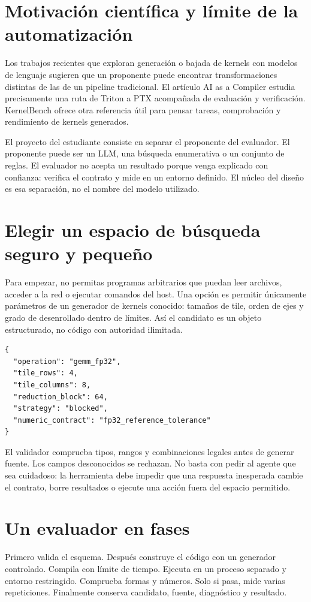 \documentclass[12pt,a4paper,oneside]{report}
\begin{document}
\section{Motivación científica y límite de la automatización}
Los trabajos recientes que exploran generación o bajada de kernels con modelos de lenguaje sugieren que un proponente puede encontrar transformaciones distintas de las de un pipeline tradicional. El artículo AI as a Compiler estudia precisamente una ruta de Triton a PTX acompañada de evaluación y verificación. KernelBench ofrece otra referencia útil para pensar tareas, comprobación y rendimiento de kernels generados. \cite{taic,kernelbench}

El proyecto del estudiante consiste en separar el proponente del evaluador. El proponente puede ser un LLM, una búsqueda enumerativa o un conjunto de reglas. El evaluador no acepta un resultado porque venga explicado con confianza: verifica el contrato y mide en un entorno definido. El núcleo del diseño es esa separación, no el nombre del modelo utilizado.

\section{Elegir un espacio de búsqueda seguro y pequeño}
Para empezar, no permitas programas arbitrarios que puedan leer archivos, acceder a la red o ejecutar comandos del host. Una opción es permitir únicamente parámetros de un generador de kernels conocido: tamaños de tile, orden de ejes y grado de desenrollado dentro de límites. Así el candidato es un objeto estructurado, no código con autoridad ilimitada.

\begin{lstlisting}
{
  "operation": "gemm_fp32",
  "tile_rows": 4,
  "tile_columns": 8,
  "reduction_block": 64,
  "strategy": "blocked",
  "numeric_contract": "fp32_reference_tolerance"
}
\end{lstlisting}
El validador comprueba tipos, rangos y combinaciones legales antes de generar fuente. Los campos desconocidos se rechazan. No basta con pedir al agente que sea cuidadoso: la herramienta debe impedir que una respuesta inesperada cambie el contrato, borre resultados o ejecute una acción fuera del espacio permitido.

\section{Un evaluador en fases}
Primero valida el esquema. Después construye el código con un generador controlado. Compila con límite de tiempo. Ejecuta en un proceso separado y entorno restringido. Comprueba formas y números. Solo si pasa, mide varias repeticiones. Finalmente conserva candidato, fuente, diagnóstico y resultado.
\end{document}
